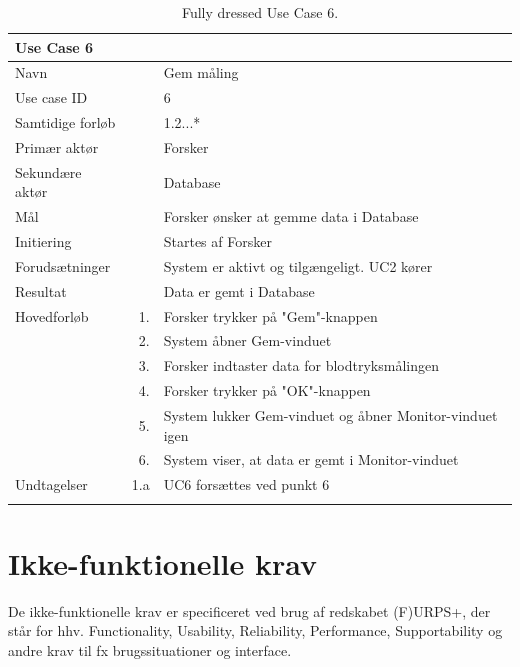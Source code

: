 \begin{longtabu} to  %
    {\large \textbf{Use Case 6}} && \\
    \toprule
    Navn &&    Gem måling\\
    Use case ID &&    6\\
    Samtidige forløb &&   1.2...*\\
    Primær aktør &&    Forsker\\
    Sekundære aktør &&	Database\\
    Mål &&    Forsker ønsker at gemme data i Database\\
    Initiering &&	Startes af Forsker\\
    Forudsætninger &&  System er aktivt og tilgængeligt. UC2 kører  \\
    Resultat &&		Data er gemt i Database                 \\ \midrule
    Hovedforløb &    1. &    Forsker trykker på "Gem"\--knappen \\	
                &    2. &    System åbner Gem-vinduet\\[-1ex]
                &    3.	&	 Forsker indtaster data for blodtryksmålingen \\[-1ex]
                &	 4. &    Forsker trykker på "OK"\--knappen  \\[-1ex]
                &	 5.	&	 System lukker Gem-vinduet og åbner Monitor-vinduet igen\\[-1ex]
                &	 6.	&	 System viser, at data er gemt i Monitor-vinduet\newline
                
                \\ \midrule
                
    Undtagelser &   1.a  &  UC6 forsættes ved punkt 6    \\ \bottomrule
\caption{Fully dressed Use Case 6.}
\label{UC6}
\end{longtabu}


\section{Ikke-funktionelle krav}
De ikke-funktionelle krav er specificeret ved brug af redskabet (F)URPS+, der står for hhv. Functionality, Usability, Reliability, Performance, Supportability og andre krav til fx brugssituationer og interface.  


